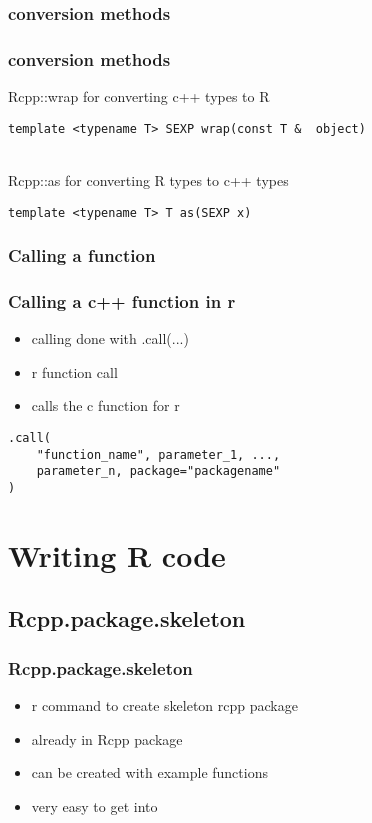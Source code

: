 \documentclass[hyperef={
    colorlinks=true,
    linkcolor=blue,
    filecolor=black,
urlcolor=blue}
]{beamer}
\begin{document}
\subsubsection{conversion methods}
\begin{frame}[fragile]
\frametitle{conversion methods}
Rcpp::wrap for converting c++ types to R
\begin{verbatim}
template <typename T> SEXP wrap(const T &  object)
\end{verbatim}
\hspace{4 mm} \\
Rcpp::as for converting R types to c++ types
\begin{verbatim}
template <typename T> T as(SEXP x)
\end{verbatim} 
\end{frame}

\subsubsection{Calling a function}
\begin{frame}[fragile]
\frametitle{Calling a c++ function in r}
\begin{itemize}
    \item calling done with .call(...)
    \item r function call
    \item calls the c function for r
\end{itemize}
\begin{verbatim}
.call(
    "function_name", parameter_1, ...,
    parameter_n, package="packagename"
)
\end{verbatim}
\end{frame}

\section{Writing R code}
\subsection{Rcpp.package.skeleton}
\begin{frame}
    \frametitle{Rcpp.package.skeleton}
\begin{itemize}
    \item r command to create skeleton rcpp package
    \item already in Rcpp package
    \item can be created with example functions
    \item very easy to get into
\end{itemize}
\end{frame}
\end{document}

